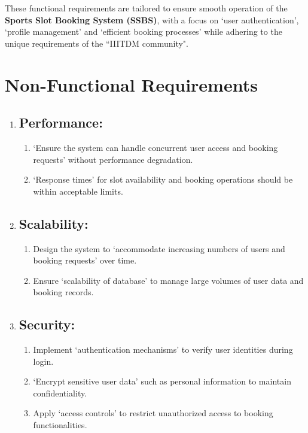 \documentclass[12pt]{article}
\begin{document}
\begin{enumerate}
\end{enumerate}

\vspace{0.2cm}

\newpage

\noindent These functional requirements are tailored to ensure smooth operation of the \textbf{Sports Slot Booking System (SSBS)}, with a focus on `user authentication', `profile management' and `efficient booking processes' while adhering to the unique requirements of the ``IIITDM community".

\section{Non-Functional Requirements}

\begin{enumerate}[label=\arabic*.]
    \item[] \subsection{Performance:}
    \begin{enumerate}[label=\alph*)]
        \item `Ensure the system can handle concurrent user access and booking requests' without performance degradation.
        \item `Response times' for slot availability and booking operations should be within acceptable limits.
    \end{enumerate}

    \vspace{0.4cm}

    \item[] \subsection{Scalability:}
    \begin{enumerate}[label=\alph*)]
        \item Design the system to `accommodate increasing numbers of users and booking requests' over time.
        \item Ensure `scalability of database' to manage large volumes of user data and booking records.
    \end{enumerate}

    \vspace{0.4cm}

    \item[] \subsection{Security:}
    \begin{enumerate}[label=\alph*)]
        \item Implement `authentication mechanisms' to verify user identities during login.
        \item `Encrypt sensitive user data' such as personal information to maintain confidentiality.
        \item Apply `access controls' to restrict unauthorized access to booking functionalities.
    \end{enumerate}


\end{enumerate}
\end{document}
